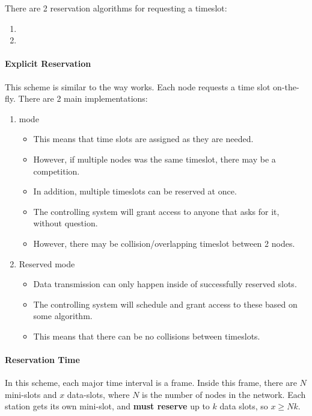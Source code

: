 There are 2 reservation algorithms for requesting a timeslot:
\begin{enumerate}[noitemsep]
\item {}
\item {}
\end{enumerate}

\paragraph{Explicit Reservation}\label{par:TDMA_Explicit_Reservation}
This scheme is similar to the way  works.
Each node requests a time slot on-the-fly.
There are 2 main implementations:
\begin{enumerate}[noitemsep]
\item {} mode
  \begin{itemize}[noitemsep]
  \item This means that time slots are assigned as they are needed.
  \item However, if multiple nodes was the same timeslot, there may be a competition.
  \item In addition, multiple timeslots can be reserved at once.
  \item The controlling system will grant access to anyone that asks for it, without question.
  \item However, there may be collision/overlapping timeslot between 2 nodes.
  \end{itemize}

\item Reserved mode
  \begin{itemize}[noitemsep]
  \item Data transmission can only happen inside of successfully reserved slots.
  \item The controlling system will schedule and grant access to these based on some algorithm.
  \item This means that there can be no collisions between timeslots.
  \end{itemize}
\end{enumerate}

\paragraph{Reservation Time}\label{par:TDMA_Reservation_Time}
In this scheme, each major time interval is a frame.
Inside this frame, there are $N$ mini-slots and $x$ data-slots, where $N$ is the number of nodes in the network.
Each station gets its own mini-slot, and \textbf{must reserve} up to $k$ data slots, so $x \geq Nk$.

